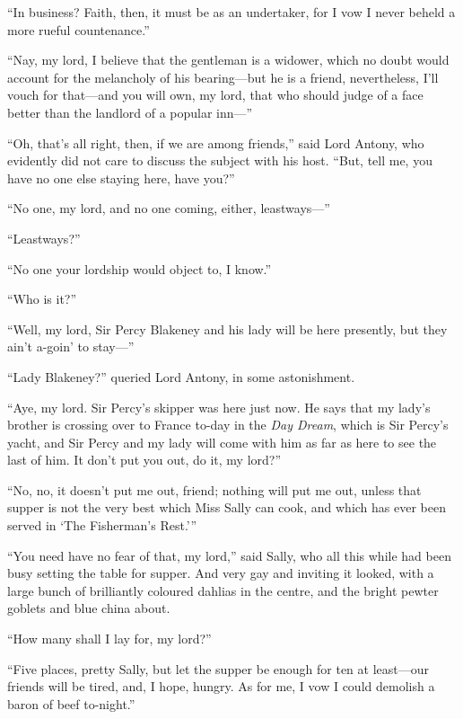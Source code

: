 \documentclass[paper=5.5in:8.5in,BCOR=7mm,twoside,DIV=calc,12pt,usegeometry,chapterprefix,endperiod,headings=big]{scrbook}
\begin{document}
\enquote{In business? Faith, then, it must be as an undertaker, for I vow I never beheld a more rueful countenance.}

\enquote{Nay, my lord, I believe that the gentleman is a widower, which no doubt would account for the melancholy of his bearing---but he is a friend, nevertheless, I'll vouch for that---and you will own, my lord, that who should judge of a face better than the landlord of a popular inn---}

\enquote{Oh, that's all right, then, if we are among friends,} said Lord Antony, who evidently did not care to discuss the subject with his host. \enquote{But, tell me, you have no one else staying here, have you?}

\enquote{No one, my lord, and no one coming, either, \newline leastways---}

\enquote{Leastways?}

\enquote{No one your lordship would object to, I know.}

\enquote{Who is it?}

\enquote{Well, my lord, Sir Percy Blakeney and his lady will be here presently, but they ain't a-goin’ to stay---}

\enquote{Lady Blakeney?} queried Lord Antony, in some astonishment.

\enquote{Aye, my lord. Sir Percy's skipper was here just now. He says that my lady's brother is crossing over to France to-day in the \textit{Day Dream}, which is Sir Percy's yacht, and Sir Percy and my lady will come with him as far as here to see the last of him. It don't put you out, do it, my lord?}

\enquote{No, no, it doesn't put me out, friend; nothing will put me out, unless that supper is not the very best which Miss Sally can cook, and which has ever been served in \enquote{The Fisherman's Rest.}}

\enquote{You need have no fear of that, my lord,} said Sally, who all this while had been busy setting the table for supper. And very gay and inviting it looked, with a large bunch of brilliantly coloured dahlias in the centre, and the bright pewter goblets and blue china about.

\enquote{How many shall I lay for, my lord?}

\enquote{Five places, pretty Sally, but let the supper be enough for ten at least---our friends will be tired, and, I hope, hungry. As for me, I vow I could demolish a baron of beef to-night.}
\end{document}
